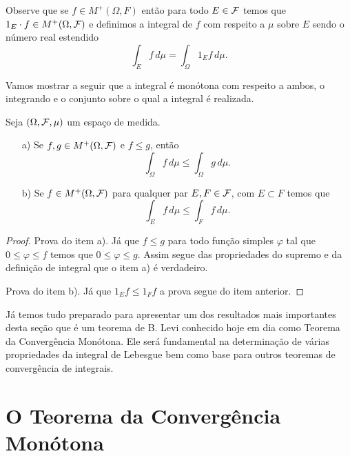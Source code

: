 Observe que se $f\in M^{+}(\Omega,F)$ então para
todo $E\in\mathcal{F}$ temos que $1_E\cdot f\in M^{+}(\Omega,\mathcal{F})$
e definimos a integral de $f$ com respeito a $\mu$ 
sobre $E$ sendo o número real estendido 
	\[
		\int_{E} f\, d\mu
		=
		\int_{\Omega} 1_{E}f\, d\mu.
	\]

Vamos mostrar a seguir que a integral é monótona 
com respeito a ambos, o integrando e o conjunto
sobre o qual a integral é realizada.






\begin{lema}
\label{lema-monotonicidade-integral-funcao-nao-negativas}
Seja $(\Omega,\mathcal{F},\mu)$ um espaço de medida.
\begin{itemize}
	\item[a)]
	Se $f,g\in M^{+}(\Omega,\mathcal{F})$	 e $f\leq g$, então 
		\[
			\int_{\Omega} f\, d\mu
			\leq
			\int_{\Omega} g\, d\mu.
		\]
	
	\item[b)] 
	Se $f\in M^{+}(\Omega,\mathcal{F})$ para 
	qualquer par $E,F\in \mathcal{F}$, com 
	$E\subset F$ temos que 
		\[
			\int_{E} f\, d\mu
			\leq
			\int_{F} f\, d\mu.
		\]
	 
\end{itemize}
\end{lema}





\begin{proof}
Prova do item a). 
Já que $f\leq g$ para todo função simples $\varphi$ 
tal que $0\leq \varphi\leq f$ temos que $0\leq \varphi\leq g$.
Assim segue das propriedades do supremo e da definição de 
integral que o item a) é verdadeiro.

Prova do item b). Já que $1_{E}f\leq 1_{F}f$
a prova segue do item anterior.
\end{proof}

\bigskip

Já temos tudo preparado para apresentar um dos resultados
mais importantes desta seção que é um teorema de B. Levi 
conhecido hoje em dia como Teorema da Convergência Monótona.
Ele será fundamental na determinação de várias propriedades
da integral de Lebesgue bem como base para outros teoremas 
de convergência de integrais. 








\section{O Teorema da Convergência Monótona}




